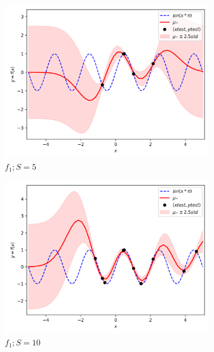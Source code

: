 \documentclass{article}
\begin{document}
\begin{figure}
\begin{subfigure}{.33\textwidth}
  \centering
  \includegraphics[width=\linewidth]{train_size/func1_5.png}
  \caption{$f_1; S = 5$}
\end{subfigure}
\begin{subfigure}{.33\textwidth}
  \centering
  \includegraphics[width=\linewidth]{train_size/func1_10.png}
  \caption{$f_1; S = 10$}
\end{subfigure}
\begin{subfigure}{.33\textwidth}
  \centering

\end{subfigure}
\end{figure}
\end{document}
